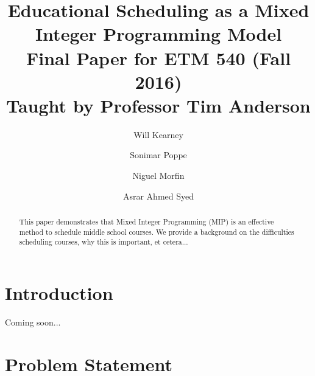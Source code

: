 \documentclass[12pt]{article}
\begin{document}
\renewcommand\Authfont{\small}
\renewcommand\Affilfont{\itshape\footnotesize}
\title{
	{Educational Scheduling as a Mixed Integer Programming Model}\\
	\vspace{2cm}
	{\large Final Paper for ETM 540 (Fall 2016)}\\
	{\large Taught by Professor Tim Anderson}\\
	\vspace{2cm}
}



\author[1,2]{Will Kearney}
\author[1,2]{Sonimar Poppe}
\author[2]{Niguel Morfin}
\author[2]{Asrar Ahmed Syed}

\maketitle
\newpage

\begin{abstract}
This paper demonstrates that Mixed Integer Programming (MIP) is an effective method to schedule middle school courses. We provide a background on the difficulties scheduling courses, why this is important, et cetera...
\end{abstract}

\newpage

\tableofcontents
\newpage


\section{Introduction}

Coming soon...

\section{Problem Statement}
\end{document}
